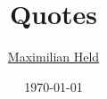 \documentclass[
		11pt,
		a4paper,
		openright,
		oneside,
		ngerman
	]
	{book}
\title{
	Quotes
}
\author{
	\href{http://www.maxheld.de}{Maximilian Held}
}
\date{
	\today
}
\begin{document}
\maketitle

\pagestyle{empty}

\begin{quote}
	
\end{quote}

\vspace{150pt}

\begin{quote}
	
\end{quote}

\vspace{150pt}

\begin{quote}
	
\end{quote}

\vspace{150pt}
\end{document}
